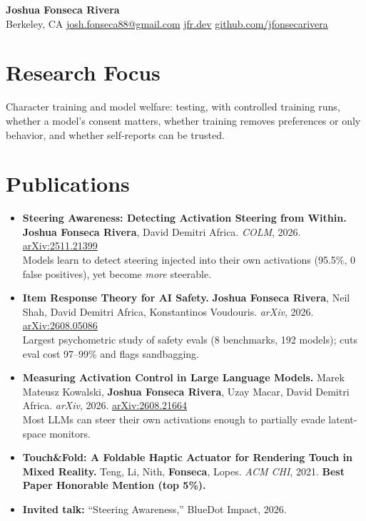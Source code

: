\documentclass[10pt,letterpaper]{article}
\newcommand{\me}{\textbf{Joshua Fonseca Rivera}}
\begin{document}
\begin{center}
    {\LARGE\textbf{Joshua Fonseca Rivera}} \\[5pt]
    Berkeley, CA \quad
    \href{mailto:josh.fonseca88@gmail.com}{josh.fonseca88@gmail.com} \quad
    \href{https://jfr.dev}{jfr.dev} \quad
    \href{https://github.com/jfonsecarivera}{github.com/jfonsecarivera}
\end{center}

\section{Research Focus}
Character training and model welfare: testing, with controlled training runs, whether a model's consent matters, whether training removes preferences or only behavior, and whether self-reports can be trusted.

\section{Publications}
\begin{itemize}
    \item \textbf{Steering Awareness: Detecting Activation Steering from Within.} \me, David Demitri Africa. \textit{COLM}, 2026. \href{https://arxiv.org/abs/2511.21399}{arXiv:2511.21399} \\
    Models learn to detect steering injected into their own activations (95.5\%, 0 false positives), yet become \textit{more} steerable.
    \item \textbf{Item Response Theory for AI Safety.} \me, Neil Shah, David Demitri Africa, Konstantinos Voudouris. \textit{arXiv}, 2026. \href{https://arxiv.org/abs/2608.05086}{arXiv:2608.05086} \\
    Largest psychometric study of safety evals (8 benchmarks, 192 models); cuts eval cost 97--99\% and flags sandbagging.
    \item \textbf{Measuring Activation Control in Large Language Models.} Marek Mateusz Kowalski, \me, Uzay Macar, David Demitri Africa. \textit{arXiv}, 2026. \href{https://arxiv.org/abs/2608.21664}{arXiv:2608.21664} \\
    Most LLMs can steer their own activations enough to partially evade latent-space monitors.
    \item \textbf{Touch\&Fold: A Foldable Haptic Actuator for Rendering Touch in Mixed Reality.} Teng, Li, Nith, \textbf{Fonseca}, Lopes. \textit{ACM CHI}, 2021. \textbf{Best Paper Honorable Mention (top 5\%).}
    \item \textbf{Invited talk:} ``Steering Awareness,'' BlueDot Impact, 2026.
\end{itemize}
\end{document}
